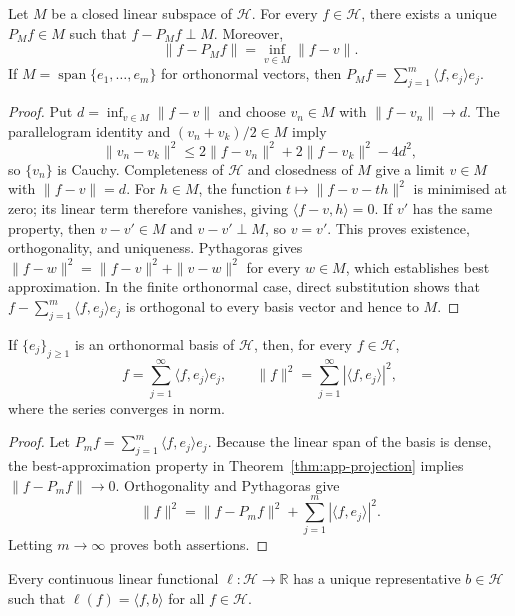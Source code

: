 \begin{theorem}
\label{thm:app-projection}
Let $M$ be a closed linear subspace of $\mathcal H$.  For every
$f\in\mathcal H$, there exists a unique $P_Mf\in M$ such that
$f-P_Mf\perp M$.  Moreover,
\[
    \|f-P_Mf\|=\inf_{v\in M}\|f-v\|.
\]
If $M=\operatorname{span}\{e_1,\ldots,e_m\}$ for orthonormal vectors, then
$P_Mf=\sum_{j=1}^m\langle f,e_j\rangle e_j$.
\end{theorem}

\begin{proof}
Put $d=\inf_{v\in M}\|f-v\|$ and choose $v_n\in M$ with
$\|f-v_n\|\to d$.  The parallelogram identity and
$(v_n+v_k)/2\in M$ imply
\[
 \|v_n-v_k\|^2
 \leq 2\|f-v_n\|^2+2\|f-v_k\|^2-4d^2,
\]
so $\{v_n\}$ is Cauchy.  Completeness of $\mathcal H$ and closedness of $M$
give a limit $v\in M$ with $\|f-v\|=d$.  For $h\in M$, the function
$t\mapsto\|f-v-th\|^2$ is minimised at zero; its linear term therefore
vanishes, giving $\langle f-v,h\rangle=0$.  If $v'$ has the same property,
then $v-v'\in M$ and $v-v'\perp M$, so $v=v'$.  This proves existence,
orthogonality, and uniqueness.  Pythagoras gives
$\|f-w\|^2=\|f-v\|^2+\|v-w\|^2$ for every $w\in M$, which establishes best
approximation.  In the finite orthonormal case, direct substitution shows
that $f-\sum_{j=1}^m\langle f,e_j\rangle e_j$ is orthogonal to every basis
vector and hence to $M$.
\end{proof}

\begin{corollary}
\label{cor:app-parseval}
If $\{e_j\}_{j\geq1}$ is an orthonormal basis of $\mathcal H$, then, for
every $f\in\mathcal H$,
\[
 f=\sum_{j=1}^{\infty}\langle f,e_j\rangle e_j,
 \qquad
 \|f\|^2=\sum_{j=1}^{\infty}|\langle f,e_j\rangle|^2,
\]
where the series converges in norm.
\end{corollary}

\begin{proof}
Let $P_mf=\sum_{j=1}^m\langle f,e_j\rangle e_j$.  Because the linear span
of the basis is dense, the best-approximation property in
Theorem~\ref{thm:app-projection} implies $\|f-P_mf\|\to0$.  Orthogonality and
Pythagoras give
\[
    \|f\|^2=\|f-P_mf\|^2
       +\sum_{j=1}^m|\langle f,e_j\rangle|^2.
\]
Letting $m\to\infty$ proves both assertions.
\end{proof}

\begin{theorem}
\label{thm:app-riesz}
Every continuous linear functional $\ell:\mathcal H\to\mathbb R$ has a
unique representative $b\in\mathcal H$ such that
$\ell(f)=\langle f,b\rangle$ for all $f\in\mathcal H$.
\end{theorem}

